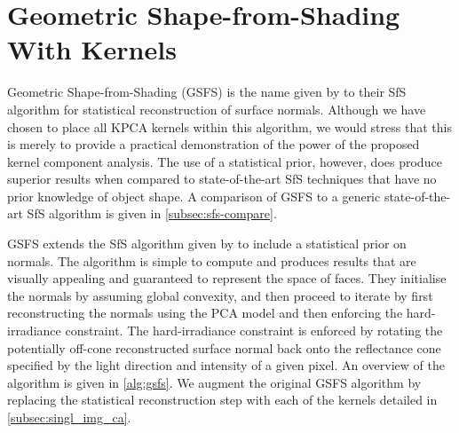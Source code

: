 \section{Geometric Shape-from-Shading With Kernels}\label{sec:singl_img_gsfs}
Geometric Shape-from-Shading (GSFS) is the name given by
\cite{smith2006recovering,worthington1999new,smith2008facial} to their
SfS algorithm for statistical
reconstruction of surface normals. Although we have chosen to place all KPCA
kernels within this algorithm, we would stress that this is merely to provide a
practical demonstration of the power of the proposed kernel component analysis.
The use of a statistical prior, however, does produce superior results when
compared to state-of-the-art SfS techniques that have no prior knowledge of
object shape. A comparison of GSFS to a generic state-of-the-art SfS algorithm
is given in \cref{subsec:sfs-compare}.

GSFS extends the SfS algorithm given by \citet{worthington1999new} to include a
statistical prior on normals. The algorithm
is simple to compute and produces results that are visually appealing and
guaranteed to represent the space of faces. They initialise the normals by
assuming global convexity, and then proceed to iterate by first reconstructing
the normals using the PCA model and then enforcing the hard-irradiance
constraint. The hard-irradiance constraint is enforced by rotating the
potentially off-cone reconstructed surface normal back onto the reflectance cone
specified by the light direction and intensity of a given pixel. An overview of
the algorithm is given in \cref{alg:gsfs}. We augment the original GSFS
algorithm by replacing the statistical reconstruction step with each of the
kernels detailed in \cref{subsec:singl_img_ca}.

